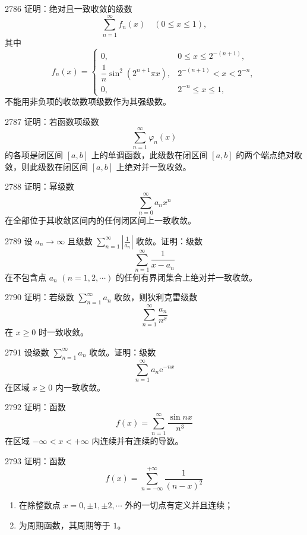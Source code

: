\begin{prob}[M]{2786}
证明：绝对且一致收敛的级数
\[
\sum_{n=1}^{\infty} f_n(x) \quad (0 \leqslant x \leqslant 1),
\]
其中
\[
f_n(x) =
\begin{cases}
0, & 0 \leqslant x \leqslant 2^{-(n+1)}, \\
\dfrac{1}{n}\sin^2(2^{n+1}\pi x), & 2^{-(n+1)} < x < 2^{-n}, \\
0, & 2^{-n} \leqslant x \leqslant 1,
\end{cases}
\]
不能用非负项的收敛数项级数作为其强级数。
\end{prob}

\begin{prob}[M]{2787}
证明：若函数项级数
\[
\sum_{n=1}^{\infty} \varphi_n(x)
\]
的各项是闭区间 $[a,b]$ 上的单调函数，此级数在闭区间 $[a,b]$ 的两个端点绝对收敛，则此级数在闭区间 $[a,b]$ 上绝对并一致收敛。
\end{prob}

\begin{prob}[M]{2788}
证明：幂级数
\[
\sum_{n=0}^{\infty} a_n x^n
\]
在全部位于其收敛区间内的任何闭区间上一致收敛。
\end{prob}

\begin{prob}[M]{2789}
设 $a_n \to \infty$ 且级数 $\displaystyle\sum_{n=1}^{\infty} \left|\frac{1}{a_n}\right|$ 收敛。证明：级数
\[
\sum_{n=1}^{\infty} \frac{1}{x - a_n}
\]
在不包含点 $a_n$ $(n=1,2,\cdots)$ 的任何有界闭集合上绝对并一致收敛。
\end{prob}

\begin{prob}[M]{2790}
证明：若级数 $\displaystyle\sum_{n=1}^{\infty} a_n$ 收敛，则狄利克雷级数
\[
\sum_{n=1}^{\infty} \frac{a_n}{n^x}
\]
在 $x \geqslant 0$ 时一致收敛。
\end{prob}

\begin{prob}[M]{2791}
设级数 $\displaystyle\sum_{n=1}^{\infty} a_n$ 收敛。证明：级数
\[
\sum_{n=1}^{\infty} a_n \mathrm{e}^{-nx}
\]
在区域 $x \geqslant 0$ 内一致收敛。
\end{prob}

\begin{prob}[M]{2792}
证明：函数
\[
f(x) = \sum_{n=1}^{\infty} \frac{\sin nx}{n^3}
\]
在区域 $-\infty < x < +\infty$ 内连续并有连续的导数。
\end{prob}

\begin{prob}[M]{2793}
证明：函数
\[
f(x) = \sum_{n=-\infty}^{+\infty} \frac{1}{(n-x)^2}
\]
\begin{enumerate}[label=(\alph*), itemsep=2pt, topsep=3pt]
  \item 在除整数点 $x = 0, \pm 1, \pm 2, \cdots$ 外的一切点有定义并且连续；
  \item 为周期函数，其周期等于 $1$。
\end{enumerate}
\end{prob}

